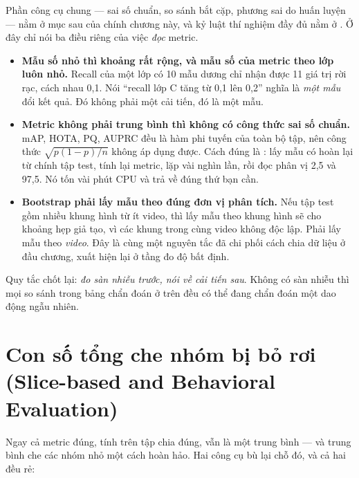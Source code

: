 \documentclass[../../deep_learning.tex]{subfiles}
\begin{document}
Phần công cụ chung --- sai số chuẩn, so sánh bắt cặp, phương sai do huấn luyện --- nằm ở mục sau của chính chương này, và kỷ luật thí nghiệm đầy đủ nằm ở . Ở đây chỉ nói ba điều riêng của việc \emph{đọc} metric.

\begin{itemize}
\item \textbf{Mẫu số nhỏ thì khoảng rất rộng, và mẫu số của metric theo lớp luôn nhỏ.} Recall của một lớp có 10 mẫu dương chỉ nhận được 11 giá trị rời rạc, cách nhau 0{,}1. Nói ``recall lớp C tăng từ 0{,}1 lên 0{,}2'' nghĩa là \emph{một mẫu} đổi kết quả. Đó không phải một cải tiến, đó là một mẫu.
\item \textbf{Metric không phải trung bình thì không có công thức sai số chuẩn.} mAP, HOTA, PQ, AUPRC đều là hàm phi tuyến của toàn bộ tập, nên công thức \(\sqrt{p(1-p)/n}\) không áp dụng được. Cách đúng là  \cite{efron1979bootstrap}: lấy mẫu có hoàn lại từ chính tập test, tính lại metric, lặp vài nghìn lần, rồi đọc phân vị 2{,}5 và 97{,}5. Nó tốn vài phút CPU và trả về đúng thứ bạn cần.
\item \textbf{Bootstrap phải lấy mẫu theo đúng đơn vị phân tích.} Nếu tập test gồm nhiều khung hình từ ít video, thì lấy mẫu theo khung hình sẽ cho khoảng hẹp giả tạo, vì các khung trong cùng video không độc lập. Phải lấy mẫu theo \emph{video}. Đây là cùng một nguyên tắc đã chi phối cách chia dữ liệu ở đầu chương, xuất hiện lại ở tầng đo độ bất định.
\end{itemize}

Quy tắc chốt lại: \emph{đo sàn nhiễu trước, nói về cải tiến sau}. Không có sàn nhiễu thì mọi so sánh trong bảng chẩn đoán ở trên đều có thể đang chẩn đoán một dao động ngẫu nhiên.

\section{Con số tổng che nhóm bị bỏ rơi (Slice-based and Behavioral Evaluation)}
Ngay cả metric đúng, tính trên tập chia đúng, vẫn là một trung bình --- và trung bình che các nhóm nhỏ một cách hoàn hảo. Hai công cụ bù lại chỗ đó, và cả hai đều rẻ:
\end{document}
